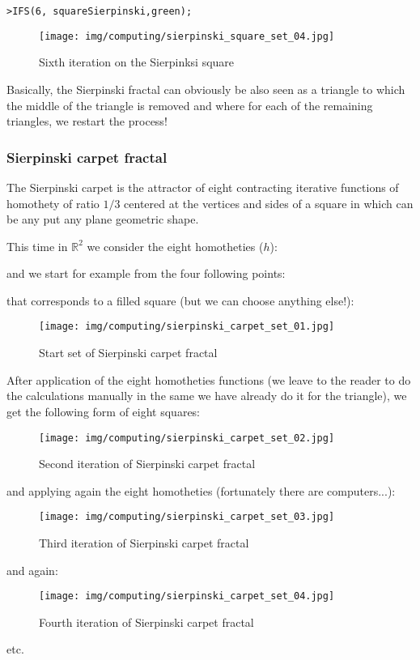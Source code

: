 	\texttt{>IFS(6, square\textunderscore  Sierpinski,green);}
	\begin{figure}[H]
		\centering
		\texttt{[image: img/computing/sierpinski\_square\_set\_04.jpg]}
		\caption[]{Sixth iteration on the Sierpinksi square}
	\end{figure}
	Basically, the Sierpinski fractal can obviously be also seen as a triangle to which the middle of the triangle is removed and where for each of the remaining triangles, we restart the process!
	
	\subsubsection{Sierpinski carpet fractal}
	The Sierpinski carpet is the attractor of eight contracting iterative functions of homothety of ratio $1/3$ centered at the vertices and sides of a square in which can be any put any plane geometric shape.

	This time in $\mathbb{R}^2$ we consider the eight homotheties ($h$):
	
	and we start for example from the four following points:
	
	that corresponds to a filled square (but we can choose anything else!):
	\begin{figure}[H]
		\centering
		\texttt{[image: img/computing/sierpinski\_carpet\_set\_01.jpg]}
		\caption[]{Start set of Sierpinski carpet fractal}
	\end{figure}
	After application of the eight homotheties functions (we leave to the reader to do the calculations manually in the same we have already do it for the triangle), we get the following form of eight squares:
	\begin{figure}[H]
		\centering
		\texttt{[image: img/computing/sierpinski\_carpet\_set\_02.jpg]}
		\caption[]{Second iteration of Sierpinski carpet fractal}
	\end{figure}
	and applying again the eight homotheties (fortunately there are computers...):
	\begin{figure}[H]
		\centering
		\texttt{[image: img/computing/sierpinski\_carpet\_set\_03.jpg]}
		\caption[]{Third iteration of Sierpinski carpet fractal}
	\end{figure}
	and again:
	\begin{figure}[H]
		\centering
		\texttt{[image: img/computing/sierpinski\_carpet\_set\_04.jpg]}
		\caption[]{Fourth iteration of Sierpinski carpet fractal}
	\end{figure}
	etc.
	

